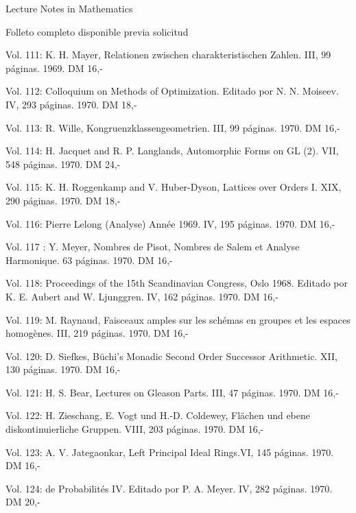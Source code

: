 


Lecture Notes in Mathematics


Folleto completo disponible previa solicitud

Vol. 111: K. H. Mayer, Relationen zwischen charakteristischen Zahlen. III, 99 páginas. 1969. DM 16,-

Vol. 112: Colloquium on Methods of Optimization. Editado por N. N. Moiseev. IV, 293 páginas. 1970. DM 18,-

Vol. 113: R. Wille, Kongruenzklassengeometrien. III, 99 páginas. 1970. DM 16,-

Vol. 114: H. Jacquet and R. P. Langlands, Automorphic Forms on GL (2). VII, 548 páginas. 1970. DM 24,-

Vol. 115: K. H. Roggenkamp and V. Huber-Dyson, Lattices over Orders I. XIX, 290 páginas. 1970. DM 18,-

Vol. 116:  Pierre Lelong (Analyse) Année 1969. IV, 195 páginas. 1970. DM 16,-

Vol. 117 : Y. Meyer, Nombres de Pisot, Nombres de Salem et Analyse Harmonique. 63 páginas. 1970. DM 16,-

Vol. 118: Proceedings of the 15th Scandinavian Congress, Oslo 1968. Editado por K. E. Aubert and W. Ljunggren. IV, 162 páginas. 1970. DM 16,-

Vol. 119: M. Raynaud, Faisceaux amples sur les schémas en groupes et les espaces homogènes. III, 219 páginas. 1970. DM 16,-

Vol. 120: D. Siefkes, Büchi's Monadic Second Order Successor Arithmetic. XII, 130 páginas. 1970. DM 16,-

Vol. 121: H. S. Bear, Lectures on Gleason Parts. III, 47 páginas. 1970. DM 16,-

Vol. 122: H. Zieschang, E. Vogt und H.-D. Coldewey, Flächen und ebene diskontinuierliche Gruppen. VIII, 203 páginas. 1970. DM 16,-

Vol. 123: A. V. Jategaonkar, Left Principal Ideal Rings.VI, 145 páginas. 1970. DM 16,-

Vol. 124:  de Probabilités IV. Editado por P. A. Meyer. IV, 282 páginas. 1970. DM 20,-

